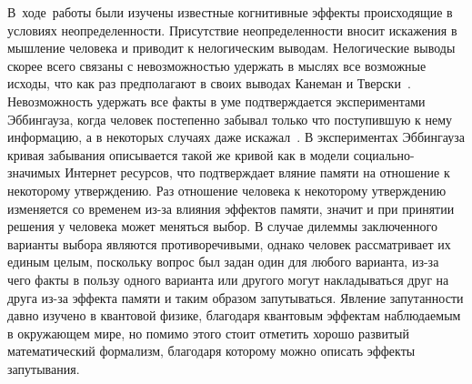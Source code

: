 \conclusion

В~ходе~работы были изучены известные когнитивные эффекты происходящие в условиях неопределенности.
Присутствие неопределенности вносит искажения в мышление человека и приводит к нелогическим выводам.
Нелогические выводы скорее всего связаны с невозможностью удержать в мыслях все возможные исходы,
что как раз предполагают в своих выводах Канеман и Тверски~\citep{tversky1983extensional}.
Невозможность удержать все факты в уме подтверждается экспериментами Эббингауза, когда человек
постепенно забывал только что поступившую к нему информацию, а в некоторых случаях даже искажал~\citep{bartlett2002human}.
В экспериментах Эббингауза кривая забывания описывается такой же кривой как в модели
социально-значимых Интернет ресурсов, что подтверждает вляние памяти на отношение к некоторому утверждению.
Раз отношение человека к некоторому утверждению изменяется со временем из-за влияния эффектов памяти,
значит и при принятии решения у человека может меняться выбор.
В случае дилеммы заключенного варианты выбора являются противоречивыми, однако человек рассматривает
их единым целым, поскольку вопрос был задан один для любого варианта, из-за чего факты в пользу одного
варианта или другого могут накладываться друг на друга из-за эффекта памяти и таким образом запутываться.
Явление запутанности давно изучено в квантовой физике, благодаря квантовым эффектам наблюдаемым
в окружающем мире, но помимо этого стоит отметить хорошо развитый математический формализм,
благодаря которому можно описать эффекты запутывания.
